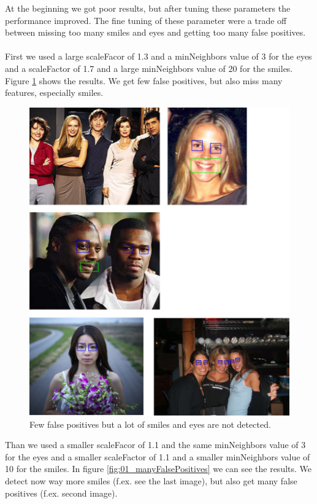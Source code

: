 \documentclass[11pt, a4paper, twocolumn]{article}
\begin{document}
At the beginning we got poor results, but after tuning these parameters the performance improved. The fine tuning of these parameter were a trade off between missing too many smiles and eyes and getting too many false positives. \\\\
%
First we used a large scaleFacor of 1.3 and a minNeighbors value of 3 for the eyes and a scaleFactor of 1.7 and a large minNeighbors value of 20 for the smiles. Figure \ref{fig:01_fewFalsePositives} shows the results. We get few false positives, but also miss many features, especially smiles.
%
\begin{figure}[H]
 \includegraphics[width=1.0\columnwidth]{images/01_fewFalsePositives_fewDetected.png}
 \centering
 \setlength{\abovecaptionskip}{1pt}
 \caption{Few false positives but a lot of smiles and eyes are not detected.}
 \label{fig:01_fewFalsePositives}
\end{figure}
%
Than we used a smaller scaleFacor of 1.1 and the same minNeighbors value of 3 for the eyes and a smaller scaleFactor of 1.1 and a smaller minNeighbors value of 10 for the smiles. In figure \ref{fig:01_manyFalsePositives} we can see the results. We detect now way more smiles (f.ex. see the last image), but also get many false positives (f.ex. second image).
\end{document}
